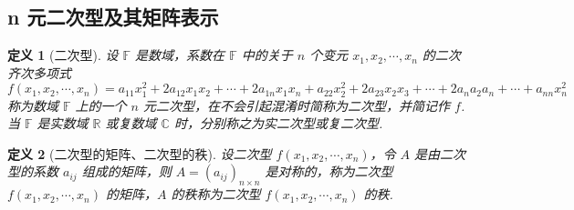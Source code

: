 \documentclass[zihao=-4,UTF8,linespread=1.8,nothm]{aytony_base}
\newtheorem{definition}{\indent 定义}[subsection]
\begin{document}
\subsection{n 元二次型及其矩阵表示}

\begin{definition}[二次型]
    设 $\mathbb{F}$ 是数域，系数在 $\mathbb{F}$ 中的关于 $n$ 个变元 ${x}_1, {x}_2, \cdots, {x}_{n}$ 的二次齐次多项式 $$
        f({x}_1, {x}_2, \cdots, {x}_{n}) = a_{11}x_1^2 + 2a_{12}x_1x_2 + \cdots + 2a_{1n}x_1x_n + a_{22}x_2^2 + 2a_{23}x_2x_3 + \cdots + 2a_na_2a_n + \cdots + a_{nn}x_n^2
    $$ 称为数域 $\mathbb{F}$ 上的一个 $n$ 元二次型，在不会引起混淆时简称为二次型，并简记作 $f$. 当 $\mathbb{F}$ 是实数域 $\mathbb{R}$ 或复数域 $\mathbb{C}$ 时，分别称之为实二次型或复二次型.
\end{definition}

\begin{definition}[二次型的矩阵、二次型的秩]
    设二次型 $f({x}_1, {x}_2, \cdots, {x}_{n})$，令 $A$ 是由二次型的系数 $a_{ij}$ 组成的矩阵，则 $A = (a_{ij})_{n \times n}$ 是对称的，称为二次型 $f(x_1, x_2, \cdots, x_n)$ 的矩阵，$A$ 的秩称为二次型 $f({x}_1, {x}_2, \cdots, {x}_{n})$ 的秩.
\end{definition}
\end{document}

